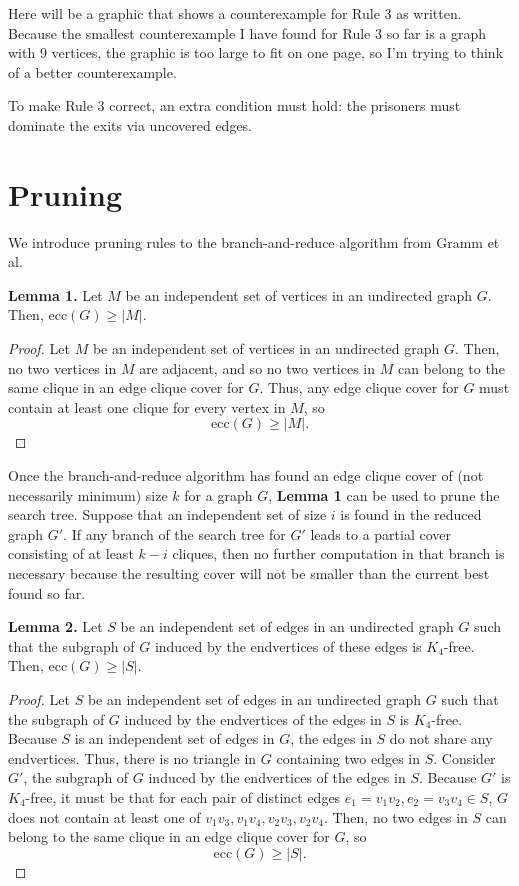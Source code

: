\documentclass[12pt]{article}
\begin{document}
    \begin{center}
        Here will be a graphic that shows a counterexample for Rule 3 as written.
        Because the smallest counterexample I have found for Rule 3 so far is a graph with 9 vertices, the graphic is too large to fit on one page, so I'm trying to think of a better counterexample.
    \end{center}

    To make Rule 3 correct, an extra condition must hold: the prisoners must dominate the exits via uncovered edges.

\newpage\section*{Pruning}
    
    We introduce pruning rules to the branch-and-reduce algorithm from Gramm et al.

    \textbf{Lemma 1.} Let $M$ be an independent set of vertices in an undirected graph $G$. Then, $\text{ecc}(G) \geq |M|$.
    \begin{proof}
        Let $M$ be an independent set of vertices in an undirected graph $G$.
        Then, no two vertices in $M$ are adjacent, and so no two vertices in $M$ can belong to the same clique in an edge clique cover for $G$.
        Thus, any edge clique cover for $G$ must contain at least one clique for every vertex in $M$, so $$\text{ecc}(G) \geq |M|.$$
    \end{proof}

    Once the branch-and-reduce algorithm has found an edge clique cover of (not necessarily minimum) size $k$ for a graph $G$, \textbf{Lemma 1} can be used to prune the search tree.
    Suppose that an independent set of size $i$ is found in the reduced graph $G'$.
    If any branch of the search tree for $G'$ leads to a partial cover consisting of at least $k-i$ cliques, then no further computation in that branch is necessary because the resulting cover will not be smaller than the current best found so far.

    \textbf{Lemma 2.} Let $S$ be an independent set of edges in an undirected graph $G$ such that the subgraph of $G$ induced by the endvertices of these edges is $K_4$-free. Then, $\text{ecc}(G) \geq |S|$.
    \begin{proof}
        Let $S$ be an independent set of edges in an undirected graph $G$ such that the subgraph of $G$ induced by the endvertices of the edges in $S$ is $K_4$-free.
        Because $S$ is an independent set of edges in $G$, the edges in $S$ do not share any endvertices.
        Thus, there is no triangle in $G$ containing two edges in $S$.
        Consider $G'$, the subgraph of $G$ induced by the endvertices of the edges in $S$.
        Because $G'$ is $K_4$-free, it must be that for each pair of distinct edges $e_1 = v_1v_2, e_2 = v_3v_4 \in S$, $G$ does not contain at least one of $v_1v_3, v_1v_4, v_2v_3, v_2v_4$.
        Then, no two edges in $S$ can belong to the same clique in an edge clique cover for $G$, so $$\text{ecc}(G) \geq |S|.$$
    \end{proof}
\end{document}

